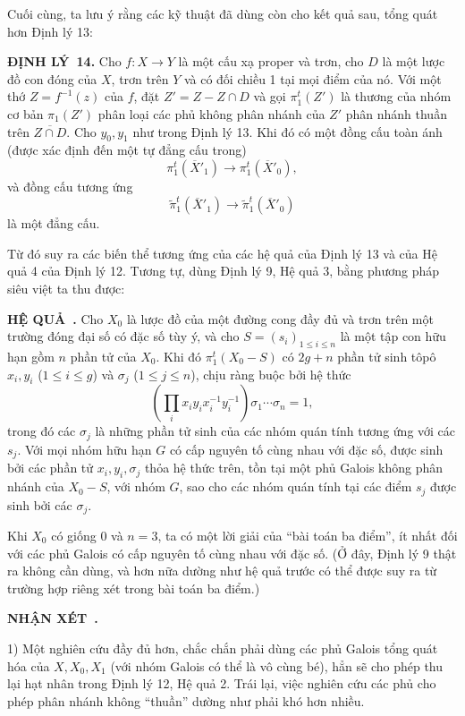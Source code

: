 \documentclass[11pt,twoside,openany]{book}
\numberwithin{equation}{section}
\newcommand{\src}[1]{%
  \phantomsection\hypertarget{src:\fgasourceid:#1}{}%
  \marginpar{\raggedleft\footnotesize\sffamily #1}%
}
\newcommand{\fgasourceid}{unset}
\newcommand{\result}[2]{\par\medskip\noindent\textbf{#1\if\relax\detokenize{#2}\relax\else\ #2\fi.}\quad}
\begin{document}
Cuối cùng, ta lưu ý rằng các kỹ thuật đã dùng còn cho kết quả sau, tổng quát
hơn Định lý 13:

\result{ĐỊNH LÝ}{14} Cho $f:X\longrightarrow Y$ là một cấu xạ proper và trơn,
cho $D$ là một lược đồ con đóng của $X$, trơn trên $Y$ và có đối chiều 1 tại
mọi điểm của nó. Với một thớ $Z=f^{-1}(z)$ của $f$, đặt $Z'=Z-Z\cap D$ và gọi
$\pi_1^t(Z')$ là thương của nhóm cơ bản $\pi_1(Z')$ phân loại các phủ không
phân nhánh của $Z'$ phân nhánh thuần trên $\overline{Z\cap D}$. Cho $y_0,y_1$
như trong Định lý 13. Khi đó có một đồng cấu toàn ánh (được xác định đến một tự
đẳng cấu trong)
\[
  \pi_1^t(\overline X'_1)\longrightarrow\pi_1^t(\overline X'_0),
\]
và đồng cấu tương ứng
\[
  \widetilde\pi_1^t(\overline X'_1)
  \longrightarrow\widetilde\pi_1^t(\overline X'_0)
\]
là một đẳng cấu.

Từ đó suy ra các biến thể tương ứng của các hệ quả của Định lý 13 và của Hệ
quả 4 của Định lý 12. Tương tự, dùng Định lý 9, Hệ quả 3, bằng phương pháp
siêu việt ta thu được:

\result{HỆ QUẢ}{} Cho $X_0$ là lược đồ của một đường cong đầy đủ và trơn trên
một trường đóng đại số có đặc số tùy ý, và cho
$S=(s_i)_{1\le i\le n}$ là một tập con hữu hạn gồm $n$ phần tử của $X_0$. Khi
đó $\pi_1^t(X_0-S)$ có $2g+n$ phần tử sinh tôpô
$x_i,y_i$ ($1\le i\le g$) và $\sigma_j$ ($1\le j\le n$), chịu ràng buộc bởi
hệ thức
\[
  \left(\prod_i x_i y_i x_i^{-1}y_i^{-1}\right)
  \sigma_1\cdots\sigma_n=1,
\]
trong đó các $\sigma_j$ là những phần tử sinh của các nhóm quán tính tương ứng
với các $s_j$. Với mọi nhóm hữu hạn $G$ có cấp nguyên tố cùng nhau với đặc số,
được sinh bởi các phần tử $x_i,y_i,\sigma_j$ thỏa hệ thức trên, tồn tại một
phủ Galois không phân nhánh của $X_0-S$, với nhóm $G$, sao cho các nhóm quán
tính tại các điểm $s_j$ được sinh bởi các $\sigma_j$.

Khi $X_0$ có giống 0 và $n=3$, ta có một lời giải của “bài toán ba điểm”, ít
nhất đối với các phủ Galois có cấp nguyên tố cùng nhau với đặc số. (Ở đây,
Định lý 9 thật ra không cần dùng, và hơn nữa dường như hệ quả trước có thể được
suy ra từ trường hợp riêng xét trong bài toán ba điểm.)

\src{220}
\result{NHẬN XÉT}{}

1) Một nghiên cứu đầy đủ hơn, chắc chắn phải dùng các phủ Galois tổng quát hóa
của $X,X_0,X_1$ (với nhóm Galois có thể là vô cùng bé), hẳn sẽ cho phép thu
lại hạt nhân trong Định lý 12, Hệ quả 2. Trái lại, việc nghiên cứu các phủ cho
phép phân nhánh không “thuần” dường như phải khó hơn nhiều.
\end{document}
